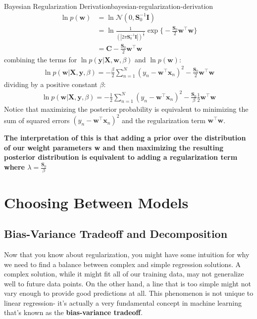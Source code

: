 \begin{derivation}{Bayesian Regularization Derivation}{bayesian-regularization-derivation}
    \begin{align*}
        \ln{p(\textbf{w})} &= \ln{\mathcal{N}(0, \boldsymbol{S}_{0}^{-1}\textbf{I})} \\
        &= \ln{\frac{1}{(|2\pi\boldsymbol{S}_{0}^{-1}\textbf{I}|)^{\frac{1}{2}}} \exp{\bigg\{-\frac{\boldsymbol{S}_{0}}{2} \textbf{w}^\top\textbf{w}\bigg\}}} \\
        &= \textbf{C} -\frac{\boldsymbol{S}_{0}}{2} \textbf{w}^\top\textbf{w}
    \end{align*}
    combining the terms for $\ln{p(\textbf{y}| \textbf{X}, \textbf{w}, \beta)}$ and $\ln{p(\textbf{w})}$:
    \begin{align*}
        \ln{p(\textbf{w}|\textbf{X},\textbf{y}, \beta)} = -\frac{\beta}{2}\sum_{n=1}^{N} (y_{n} - \textbf{w}^\top \textbf{x}_{n})^2 - \frac{\boldsymbol{S}_{0}}{2} \textbf{w}^\top\textbf{w}
    \end{align*}
    dividing by a positive constant $\beta$:
    \begin{align*}
        \ln{p(\textbf{w}|\textbf{X},\textbf{y}, \beta)} = -\frac{1}{2}\sum_{n=1}^{N} (y_{n} - \textbf{w}^\top \textbf{x}_{n})^2 - \frac{\boldsymbol{S}_{0}}{\beta}\frac{1}{2} \textbf{w}^\top\textbf{w}
    \end{align*}
    Notice that maximizing the posterior probability is equivalent to minimizing the sum of squared errors $(y_{n} - \textbf{w}^\top \textbf{x}_{n})^2$ and the regularization term $\textbf{w}^\top\textbf{w}$.
\end{derivation}

\textbf{The interpretation of this is that adding a prior over the distribution of our weight parameters \textbf{w} and then maximizing the resulting posterior distribution is equivalent to adding a regularization term where $\lambda = \frac{\boldsymbol{S}_{0}}{\beta}$}

\section{Choosing Between Models}
\subsection{Bias-Variance Tradeoff and Decomposition}
Now that you know about regularization, you might have some intuition for why we need to find a balance between complex and simple regression solutions. A complex solution, while it might fit all of our training data, may not generalize well to future data points. On the other hand, a line that is too simple might not vary enough to provide good predictions at all. This phenomenon is not unique to linear regression- it's actually a very fundamental concept in machine learning that's known as the \textbf{bias-variance tradeoff}.

